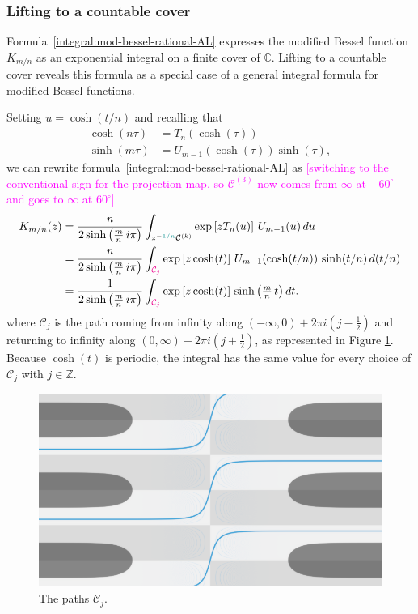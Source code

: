 \documentclass{article}
\newcommand{\Z}{\mathbb{Z}}
\newcommand{\C}{\mathbb{C}}
\theoremstyle{definition}
\theoremstyle{plain}
\begin{document}
\subsubsection{Lifting to a countable cover}\label{countable-cover}
Formula~\eqref{integral:mod-bessel-rational-AL} expresses the modified Bessel function $K_{m/n}$ as an exponential integral on a finite cover of $\C$. Lifting to a countable cover reveals this formula as a special case of a general integral formula for modified Bessel functions.

Setting $u = \cosh(t/n)$ and recalling that
\begin{align*}
\cosh(n\tau) & = T_n(\cosh(\tau)) \\
\sinh(m\tau) & = U_{m-1}(\cosh(\tau)) \sinh(\tau),
\end{align*}
we can rewrite formula~\eqref{integral:mod-bessel-rational-AL} as \textcolor{magenta}{[switching to the conventional sign for the projection map, so $\mathcal{C}^{(3)}$ now comes from $\infty$ at $-60^\circ$ and goes to $\infty$ at $60^\circ$]}
\begin{align}
\notag K_{m/n}(z) & = \frac{n}{2 \sinh\big(\tfrac{m}{n}\,i\pi\big)} \int_{z^{-\textcolor{DarkCyan}{1/n}}\mathcal{C}^{(k)}} \exp\left[z T_n(u)\right]\,U_{m-1}(u)\,du \\
\notag & = \frac{n}{2 \sinh\big(\tfrac{m}{n}\,i\pi\big)} \int_{\textcolor{magenta}{\mathcal{C}_j}} \exp\left[z \cosh(t)\right]\,U_{m-1}(\cosh(t/n))\,\sinh(t/n)\,d(t/n) \\
\label{integral:mod-bessel-lifted} & = \frac{1}{2 \sinh\big(\tfrac{m}{n}\,i\pi\big)} \int_{\textcolor{magenta}{\mathcal{C}_j}} \exp\left[z \cosh(t)\right]\,\sinh\big(\tfrac{m}{n}\,t\big)\,dt.
\end{align}
where $\mathcal{C}_j$ is the path coming from infinity along $(-\infty,0) + 2\pi i (j - \tfrac{1}{2})$ and returning to infinity along $(0, \infty) + 2\pi i (j + \tfrac{1}{2})$, as represented in Figure \ref{fig:bessel_unrolled}. Because $\cosh(t)$ is periodic, the integral has the same value for every choice of $\mathcal{C}_j$ with $j\in\Z$.  
\begin{figure}[ht]
    \centering
    \includegraphics[scale=0.3]{figures/Bessel0_unrolled_lightblue.png}
    \caption{The paths $\mathcal{C}_j$.}
    \label{fig:bessel_unrolled}
\end{figure}
\end{document}
